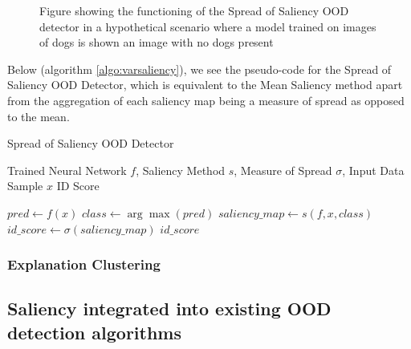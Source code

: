 \documentclass[UKenglish]{uiomasterthesis} %
\theoremstyle{definition}
\begin{document}
\begin{figure}
\begin{center}

    \caption[Spred of Saliency visual explanation]{Figure showing the functioning of the Spread of Saliency OOD detector in a hypothetical scenario where a model trained on images of dogs is shown an image with no dogs present}
    \label{fig:varsaliency}
    \end{center}
\end{figure}

Below (algorithm \ref{algo:varsaliency}), we see the pseudo-code for the Spread of Saliency OOD Detector, which is equivalent to the Mean Saliency method apart from the aggregation of each saliency map being a measure of spread as opposed to the mean.


\begin{algorithm}
    \caption{Spread of Saliency OOD Detector}
    \label{algo:varsaliency}
    \begin{algorithmic}
    \Require Trained Neural Network $f$, Saliency Method $s$, Measure of Spread $\sigma$, Input Data Sample $x$
    \Ensure ID Score

        \State $pred \gets f(x)$
        \State $class \gets \arg\max(pred)$
        \State $saliency\_map \gets s(f, x, class)$
        \State $id\_score \gets \sigma(saliency\_map)$
        \State \Return $id\_score$
    \EndFunction

    \end{algorithmic}
\end{algorithm}




\subsubsection{Explanation Clustering}


\subsection{Saliency integrated into existing OOD detection algorithms}
\end{document}
